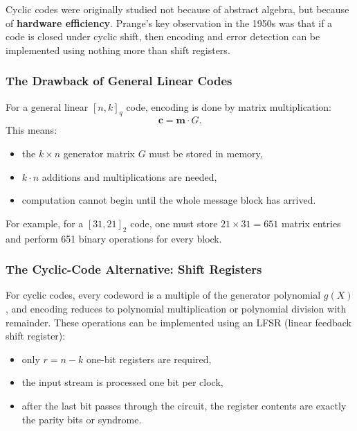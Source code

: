 \documentclass[
]{article}
\providecommand{\tightlist}{%
  \setlength{\itemsep}{0pt}\setlength{\parskip}{0pt}}
\begin{document}
Cyclic codes were originally studied not because of abstract algebra,
but because of \textbf{hardware efficiency}. Prange's key observation in
the 1950s was that if a code is closed under cyclic shift, then encoding
and error detection can be implemented using nothing more than shift
registers.

\subsubsection{The Drawback of General Linear
Codes}\label{the-drawback-of-general-linear-codes}

For a general linear \([n,k]_q\) code, encoding is done by matrix
multiplication: \[\mathbf{c} = \mathbf{m} \cdot G.\] This means:

\begin{itemize}
\tightlist
\item
  the \(k \times n\) generator matrix \(G\) must be stored in memory,
\item
  \(k \cdot n\) additions and multiplications are needed,
\item
  computation cannot begin until the whole message block has arrived.
\end{itemize}

For example, for a \([31,21]_2\) code, one must store
\(21 \times 31 = 651\) matrix entries and perform 651 binary operations
for every block.

\subsubsection{The Cyclic-Code Alternative: Shift
Registers}\label{the-cyclic-code-alternative-shift-registers}

For cyclic codes, every codeword is a multiple of the generator
polynomial \(g(X)\), and encoding reduces to polynomial multiplication
or polynomial division with remainder. These operations can be
implemented using an LFSR (linear feedback shift register):

\begin{itemize}
\tightlist
\item
  only \(r=n-k\) one-bit registers are required,
\item
  the input stream is processed one bit per clock,
\item
  after the last bit passes through the circuit, the register contents
  are exactly the parity bits or syndrome.
\end{itemize}
\end{document}
